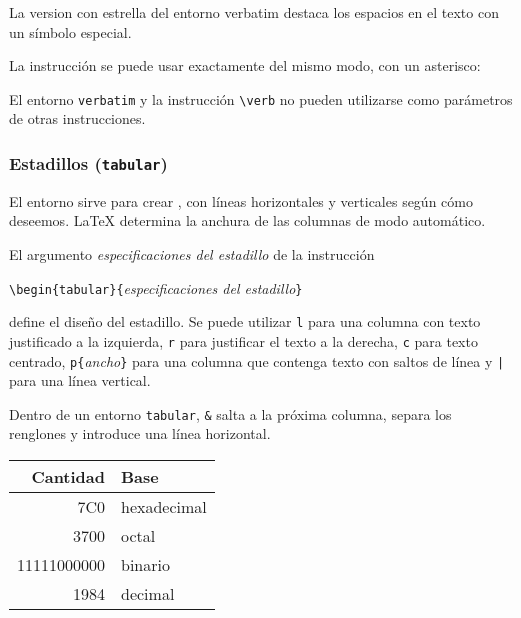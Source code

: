 \begin{example}
\begin{verbatim*}
La version con estrella del
entorno          verbatim
destaca los espacios     en
el  texto con un símbolo
  especial.
\end{verbatim*}
\end{example}

La instrucción  se puede usar exactamente del mismo modo, con
un asterisco:

\begin{example}
\end{example}

El entorno  \texttt{verbatim} y la instrucción  \verb|\verb| no pueden
utilizarse como parámetros de otras instrucciones.

\subsubsection{Estadillos (\texttt{tabular})}

El entorno   sirve para crear  , con líneas
horizontales y  verticales según cómo deseemos.  \LaTeX{} determina la
anchura de las columnas de modo automático.

El argumento \emph{especificaciones del estadillo} de la instrucción

\begin{command}
\verb|\begin{tabular}{|\emph{especificaciones del estadillo}\verb|}|
\end{command} 

\noindent define  el diseño del estadillo. Se puede utilizar \texttt{l}
para una columna con texto justificado a la izquierda, \texttt{r} para
justificar  el texto  a la  derecha, \texttt{c}  para texto  centrado,
\verb|p{|\emph{ancho}\verb|}| para una columna  que contenga texto con
saltos de línea y \verb.|. para una línea vertical.


Dentro de  un entorno  \texttt{tabular}, \verb|&|  salta a  la próxima
columna,  \ci{\bs} separa  los  renglones y   introduce  una
línea horizontal.

\begin{example}
\begin{tabular}{|r|l|}
\hline
Cantidad & Base \\
\hline
\hline
7C0 & hexadecimal \\
3700 & octal \\
11111000000 & binario \\
\hline \hline
1984 & decimal \\
\hline
\end{tabular}
\end{example}

